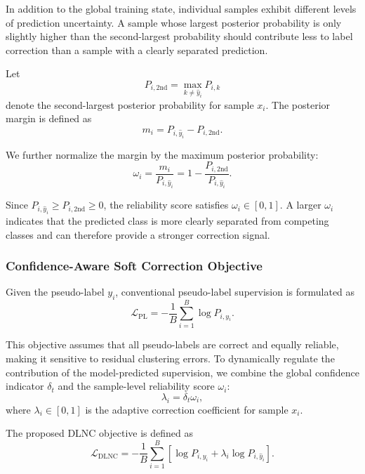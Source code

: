 \documentclass[lettersize,journal]{IEEEtran}
\begin{document}
In addition to the global training state, individual samples
exhibit different levels of prediction uncertainty. A sample
whose largest posterior probability is only slightly higher than
the second-largest probability should contribute less to label
correction than a sample with a clearly separated prediction.

Let
\begin{equation}
P_{i,\mathrm{2nd}}
=
\max_{k\neq\hat{y}_i}P_{i,k}
\end{equation}
denote the second-largest posterior probability for sample
$x_i$. The posterior margin is defined as
\begin{equation}
m_i
=
P_{i,\hat{y}_i}
-
P_{i,\mathrm{2nd}}.
\end{equation}

We further normalize the margin by the maximum posterior
probability:
\begin{equation}
\omega_i
=
\frac{m_i}{P_{i,\hat{y}_i}}
=
1-
\frac{P_{i,\mathrm{2nd}}}{P_{i,\hat{y}_i}}.
\end{equation}

Since $P_{i,\hat{y}_i}\geq P_{i,\mathrm{2nd}}\geq 0$, the
reliability score satisfies $\omega_i\in[0,1]$. A larger
$\omega_i$ indicates that the predicted class is more clearly
separated from competing classes and can therefore provide a
stronger correction signal.

\subsubsection{Confidence-Aware Soft Correction Objective}

Given the pseudo-label $y_i$, conventional pseudo-label
supervision is formulated as
\begin{equation}
\mathcal{L}_{\mathrm{PL}}
=
-\frac{1}{B}
\sum_{i=1}^{B}
\log P_{i,y_i}.
\end{equation}

This objective assumes that all pseudo-labels are correct and
equally reliable, making it sensitive to residual clustering
errors. To dynamically regulate the contribution of the
model-predicted supervision, we combine the global confidence
indicator $\delta_t$ and the sample-level reliability score
$\omega_i$:
\begin{equation}
\lambda_i
=
\delta_t\omega_i,
\end{equation}
where $\lambda_i\in[0,1]$ is the adaptive correction coefficient
for sample $x_i$.

The proposed DLNC objective is defined as
\begin{equation}
\mathcal{L}_{\mathrm{DLNC}}
=
-\frac{1}{B}
\sum_{i=1}^{B}
\left[
\log P_{i,y_i}
+
\lambda_i\log P_{i,\hat{y}_i}
\right].
\end{equation}
\end{document}
